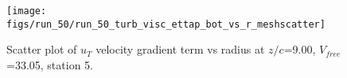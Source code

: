 \begin{figure}[H]
\centering
\texttt{[image: figs/run\_50/run\_50\_turb\_visc\_ettap\_bot\_vs\_r\_meshscatter]}
\caption{Scatter plot of $
u_T$ velocity gradient term vs radius at $z/c$=9.00, $V_{free}$=33.05, station 5.}
\end{figure}


